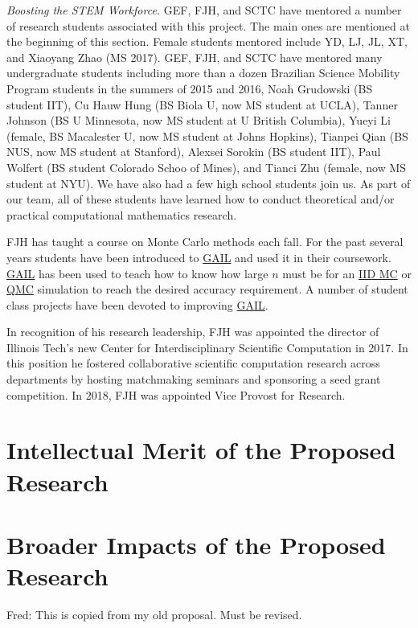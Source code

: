\documentclass[11pt]{NSFamsart}
\newcommand{\GAIL}{\hyperlink{GAILlink}{GAIL}\xspace}
\newcommand{\QMC}{\hyperlink{QMClink}{QMC}\xspace}
\newcommand{\IIDMC}{\hyperlink{IIDMClink}{IID MC}\xspace}
\newcommand{\FJHNote}[1]{{\color{blue}Fred: #1}}
\begin{document}
\emph{Boosting the STEM Workforce.} GEF, FJH, and SCTC have mentored a number of 
research students associated with this project.  The main ones are mentioned at the beginning of 
this section.  Female students mentored include YD, LJ, JL, XT, and Xiaoyang Zhao (MS 2017).   GEF, FJH,  and SCTC have mentored many undergraduate students including more than a dozen 
Brazilian Science Mobility Program students in the summers of 2015 and 2016, Noah Grudowski (BS student IIT), Cu Hauw Hung (BS Biola U, now MS student at UCLA), Tanner Johnson (BS U Minnesota, now MS student at U British Columbia), Yueyi Li (female, BS Macalester U, now MS student at Johns Hopkins), Tianpei Qian (BS NUS, now MS student at Stanford), Alexsei Sorokin (BS student IIT), Paul Wolfert (BS student Colorado Schoo of Mines), and 
Tianci Zhu (female, now MS student at NYU).  We have also had a few high school students join us. As part of our team, all of
these students have learned how to conduct theoretical and/or practical computational mathematics research.

FJH has taught a course on Monte Carlo methods each fall.  For the past several years students 
have been introduced to \GAIL and used it in their coursework.  \GAIL has been used to teach how 
to know how large $n$ must be for an \IIDMC or \QMC simulation to reach the desired accuracy 
requirement.  A number of student class projects have been devoted to improving \GAIL.

In recognition of his research leadership, FJH was appointed the director of Illinois Tech's new Center for Interdisciplinary 
Scientific Computation in 2017.  In this position he fostered collaborative scientific computation 
research across departments by hosting matchmaking seminars and sponsoring a seed grant 
competition. In 2018, FJH was appointed Vice Provost for Research.




\section{Intellectual Merit of the Proposed Research} \label{sec:Proposed}




\section{Broader Impacts of the Proposed Research}\label{SectBroad}
\FJHNote{This is copied from my old proposal.  Must be revised.}
\end{document}
